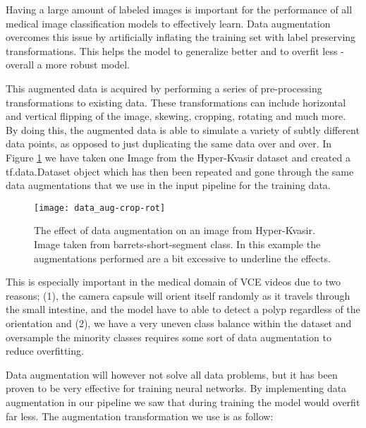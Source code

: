 \documentclass[thesis.tex]{subfiles}
\begin{document}
Having a large amount of labeled images is important for the performance of all medical image classification models to effectively learn. Data augmentation overcomes this issue by artificially inflating the training set with label preserving transformations. This helps the model to generalize better and to overfit less - overall a more robust model.

This augmented data is acquired by performing a series of pre-processing transformations to existing data. These transformations can include horizontal and vertical flipping of the image, skewing, cropping, rotating and much more. By doing this, the augmented data is able to simulate a variety of subtly different data points, as opposed to just duplicating the same data over and over. In Figure \ref{fig:data_aug-crop-rot} we have taken one Image from the Hyper-Kvasir dataset and created a tf.data.Dataset object which has then been repeated and gone through the same data augmentations that we use in the input pipeline for the training data.

\begin{figure} %
  \begin{center}
    \texttt{[image: data\_aug-crop-rot]}
    \caption[The effect of data augmentation on sample image.]{The effect of data augmentation on an image from Hyper-Kvasir. Image taken from barrets-short-segment class. In this example the augmentations performed are a bit excessive to underline the effects.}
    \label{fig:data_aug-crop-rot}
  \end{center}
\end{figure}

This is especially important in the medical domain of VCE videos due to two reasons; (1), the camera capsule will orient itself randomly as it travels through the small intestine, and the model have to able to detect a polyp regardless of the orientation and (2), we have a very uneven class balance within the dataset and oversample the minority classes requires some sort of data augmentation to reduce overfitting.

Data augmentation will however not solve all data problems, but it has been proven to be very effective for training neural networks. By implementing data augmentation in our pipeline we saw that during training the model would overfit far less. The augmentation transformation we use is as follow:
\end{document}
